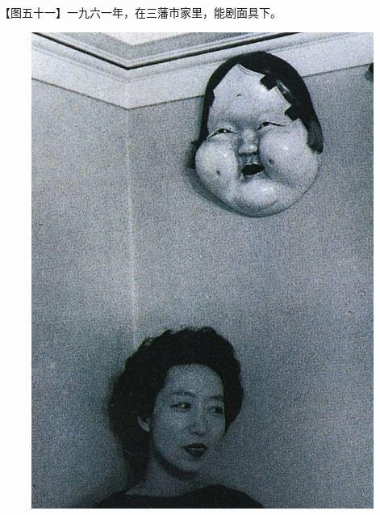 \clearpage
\par 【图五十一】一九六一年，在三藩市家里，能剧面具下。
\begin{figure}[htb]
    \centering %
    \includegraphics[scale=0.4]{picture/对照记51.jpeg}
\end{figure}

